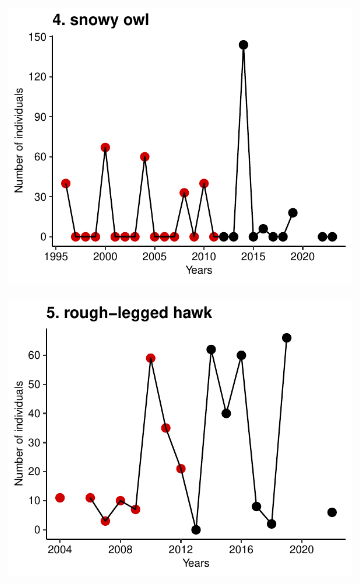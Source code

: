 \documentclass[a4paper,twoside,10pt]{article}
\begin{document}
\begin{figure}[ht]
\centering
\begin{subfigure}{0.45\textwidth}
\includegraphics[width=\linewidth]{figures/species_temporal_series/snowy_owl.pdf}
\end{subfigure}
\begin{subfigure}{0.45\textwidth}
\includegraphics[width=\linewidth]{figures/species_temporal_series/rough-legged_hawk.pdf}
\end{subfigure}
\hfill
\begin{subfigure}{0.45\textwidth}

\end{subfigure}
\end{figure}
\end{document}

